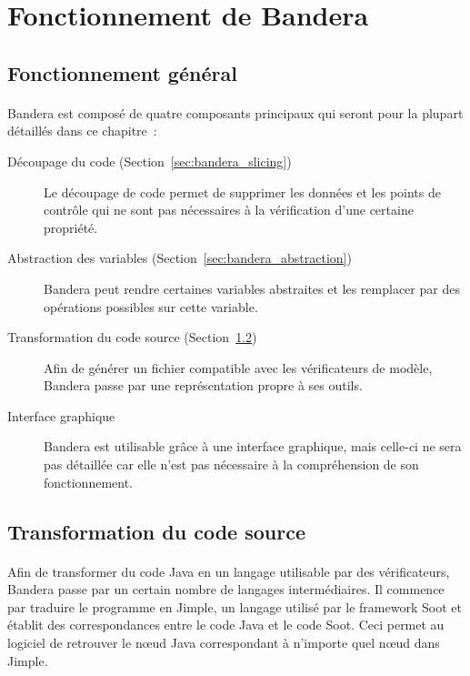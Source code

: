 \section{Fonctionnement de Bandera}
\subsection{Fonctionnement général}

\paragraph{}
Bandera est composé de quatre composants principaux qui seront pour la
plupart détaillés dans ce chapitre~:

\begin{description}
\item[Découpage du code (Section~\ref{sec:bandera_slicing})] Le découpage de code permet de supprimer les
  données et les points de contrôle qui ne sont pas nécessaires à la
  vérification d'une certaine propriété.
\item[Abstraction des variables (Section~\ref{sec:bandera_abstraction})] Bandera peut rendre certaines
  variables abstraites et les remplacer par des opérations possibles
  sur cette variable.
\item[Transformation du code source (Section~\ref{sec:bandera_source})] Afin de générer un fichier
  compatible avec les vérificateurs de modèle, Bandera passe par une
  représentation propre à ses outils.
\item[Interface graphique] Bandera est utilisable grâce à une
  interface graphique, mais celle-ci ne sera pas détaillée car elle
  n'est pas nécessaire à la compréhension de son fonctionnement.
\end{description}

\subsection{Transformation du code source}
\label{sec:bandera_source}

\paragraph{}
Afin de transformer du code Java en un langage utilisable par des
vérificateurs, Bandera passe par un certain nombre de langages
intermédiaires. Il commence par traduire le programme en Jimple, un
langage utilisé par le framework Soot et établit des correspondances
entre le code Java et le code Soot. Ceci permet au logiciel de
retrouver le n\oe{}ud Java correspondant à n'importe quel n\oe{}ud
dans Jimple.

